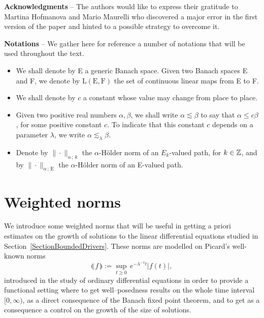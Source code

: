 \documentclass[11pt,a4paper]{amsart}
\renewcommand{\leq}{\leqslant}
\renewcommand{\geq}{\geqslant}
\numberwithin{equation}{section} %
\begin{document}
\bigskip

\noindent \textbf{Acknowledgments} -- The authors would like to express their gratitude to Martina Hofmanova and Mario Maurelli who discovered a major error in the first version of the paper and hinted to a possible strategy to overcome it.
\bigskip

\noindent \textbf{Notations} -- We gather here for reference a number of notations that will be used throughout the text.
\begin{itemize}
   \item We shall denote by E a generic Banach space. Given two Banach spaces E and F, we denote by $\textrm{L}(\textrm{E},\textrm{F})$ the set of continuous linear maps from E to F. \vspace{0.1cm}
   \item We shall denote by $c$ a constant whose value may change from place to place. \vspace{0.1cm}
   \item Given two positive real numbers $\alpha,\beta$, we shall write $\alpha \lesssim \beta$ to say that $\alpha\leq c\beta$, for some positive constant $c$. To indicate that this constant $c$ depends on a parameter $\lambda$, we write $\alpha \lesssim_\lambda \beta$. \vspace{0.1cm}
   \item Denote by $\|\cdot\|_{\alpha\,;\,k}$ the $\alpha$-H\"older norm of an $E_k$-valued path, for $k\in\mathbb{Z}$, and by $\|\cdot\|_{\alpha\,;\,\textrm{E}}$ the $\alpha$-H\"older norm of an E-valued path.
\end{itemize}


\bigskip

\section{Weighted norms}
\label{SectionWeightedNorms}

We introduce  some weighted norms that will be useful in getting a priori estimates on the growth of solutions to the linear differential equations studied in Section~\ref{SectionBoundedDrivers}. These norms are modelled on Picard's well-known norms
$$
\llparenthesis\, f \,\rrparenthesis := \underset{t\geq 0}{\sup}\,e^{-\lambda^{-1} t}\big| f(t) \big|,
$$
introduced in the study of ordinary differential equations in order to provide a functional setting where to get well--posedness results on the whole time interval $[0,\infty)$, as a direct consequence of the Banach fixed point theorem, and to get as a consequence a control on the growth of the size of solutions. 
\end{document}
